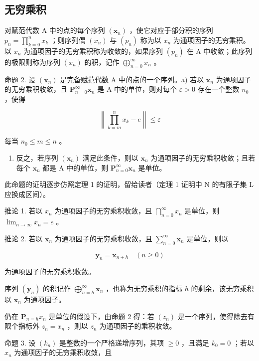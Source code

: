 \subsection{无穷乘积}

对赋范代数 A 中的点的每个序列 \((\pmb{x}_n)\) ，使它对应于部分积的序列 \(p_n = \prod_{k=0}^{n} x_k\) ；则序列偶 \((x_{n})\) 与 \((p_{n})\) 称为以 \(x_{n}\) 为通项因子的无穷乘积。以 \(x_{n}\) 为通项因子的无穷乘积称为收敛的，如果序列 \((p_{n})\) 在 A 中收敛；此序列的极限则称为序列 \((x_{n})\) 的积，记作 \(\bigoplus_{n=0}^{\infty} x_{n}\) 。

命题 2. 设 \((\pmb{x}_n)\) 是完备赋范代数 A 中的点的一个序列。a) 若以 \(\pmb{x}_n\) 为通项因子的无穷乘积收敛，且 \(\mathbf{P}_{n=0}^{\infty}\pmb{x}_n\) 是 A 中的单位，则对每个 \(\varepsilon > 0\) 存在一个整数 \(n_0\) ，使得

\[
\left\| \prod_ {k = m} ^ {n} x _ {k} - e \right\| \leqslant \varepsilon
\]

每当 \(n_0 \leqslant m \leqslant n\) 。

\begin{enumerate}
\def\labelenumi{\alph{enumi})}
\setcounter{enumi}{1}
\tightlist
\item
  反之，若序列 \((\pmb{x}_n)\) 满足此条件，则以 \(\pmb{x}_n\) 为通项因子的无穷乘积收敛；且若每个 \(\pmb{x}_n\) 都是 A 中的单位，则 \(\mathbf{P}_{n=0}^{\infty}\pmb{x}_n\) 是单位。
\end{enumerate}

此命题的证明逐步仿照定理 1 的证明，留给读者（定理 1 证明中 N 的有限子集 L 应换成区间）。

推论 1. 若以 \(x_{n}\) 为通项因子的无穷乘积收敛，且 \(\bigcap_{n=0}^{\infty}x_{n}\) 是单位，则 \(\lim_{n\to\infty}x_{n}=e\) 。

推论 2. 若以 \(\pmb{x}_n\) 为通项因子的无穷乘积收敛，且 \(\mathop{\sum }\limits_{{n = 0}}^{\infty}{\pmb{x}}_{n}\) 是单位，则以

\[
\mathbf {y} _ {n} = \mathbf {x} _ {n + h} \quad (n \geqslant 0)
\]

为通项因子的无穷乘积收敛。

序列 \((\mathbf{y}_n)\) 的积记作 \(\bigoplus_{n = h}^{\infty}\mathbf{x}_n\) ，也称为无穷乘积的指标 \(h\) 的剩余，该无穷乘积以 \(\mathbf{x}_n\) 为通项因子。

仍在 \(\mathbf{P}_{n=h} x_n\) 是单位的假设下，由命题 2 得：若 \((z_n)\) 是一个序列，使得除去有限个指标外 \(z_n = x_n\) ，则以 \(z_n\) 为通项因子的乘积收敛。

命题 3. 设 \((k_{n})\) 是整数的一个严格递增序列，其项 \(\geqslant 0\) ，且满足 \(k_{0} = 0\) ；若以 \(x_{n}\) 为通项因子的无穷乘积收敛，且

